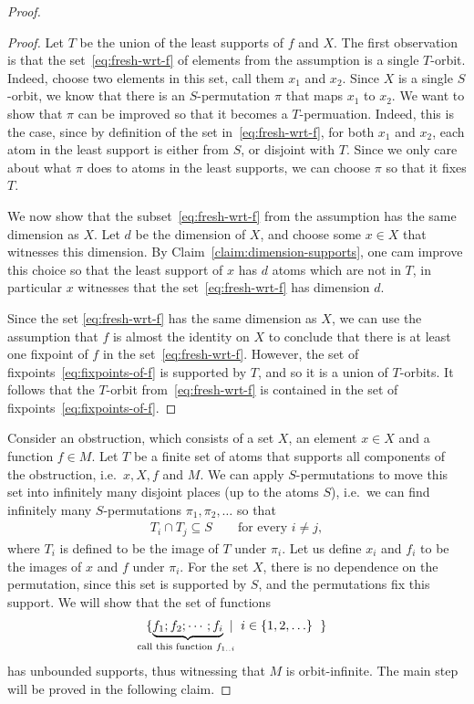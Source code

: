 \begin{proof}
\begin{proof}
        Let $T$ be the union of the least supports of $f$ and $X$. 
        The first observation is that the set~\eqref{eq:fresh-wrt-f} of elements from the assumption   is a single $T$-orbit.
        Indeed, choose two elements in this set, call them $x_1$ and $x_2$. Since $X$ is a single $S$-orbit, we know that there is an $S$-permutation $\pi$ that maps $x_1$ to $x_2$. We want to show that $\pi$ can be improved so that it becomes a $T$-permuation. Indeed, this is the case, since by definition of the set in~\eqref{eq:fresh-wrt-f}, for both $x_1$ and $x_2$, each atom in the least support is either from $S$, or disjoint with $T$. Since we only care about what $\pi$ does to atoms in the least supports, we can choose $\pi$ so that it fixes $T$. 
        
        We now show that the subset~\eqref{eq:fresh-wrt-f} from the assumption has the same dimension as $X$. 
        Let $d$ be the dimension of $X$, and choose some $x \in X$ that witnesses this dimension.  By Claim~\ref{claim:dimension-supports}, one cam improve this choice so that the least support of $x$ has $d$ atoms which are not in $T$, in particular $x$ witnesses that the set~\eqref{eq:fresh-wrt-f} has dimension $d$. 
        
        Since the set \eqref{eq:fresh-wrt-f} has the same dimension as $X$, we can use the assumption that $f$ is almost the identity on $X$ to conclude that there is at least one fixpoint of $f$ in the set~\eqref{eq:fresh-wrt-f}. However, the set of fixpoints~\eqref{eq:fixpoints-of-f} is supported by $T$, and so it is a union of $T$-orbits. It follows that the $T$-orbit from~\eqref{eq:fresh-wrt-f} is contained in the set of fixpoints~\eqref{eq:fixpoints-of-f}.
    \end{proof}


    Consider an obstruction, which consists of a set $X$, an element $x \in X$ and a function $f \in M$. Let $T$ be a finite set of atoms that supports all components of the obstruction, i.e.~$x, X,f$ and $M$. We can apply $S$-permutations to move this set into infinitely many disjoint places (up to the atoms $S$), i.e.~we can find infinitely many $S$-permutations $\pi_1,\pi_2,\ldots$ so that  
    \begin{align*}
    T_i \cap T_j \subseteq S \qquad \text{for every } i \neq j,
    \end{align*}
    where $T_i$ is defined to be the image of $T$ under $\pi_i$. Let us define $x_i$ and $f_i$ to be the images of $x$ and $f$ under $\pi_i$.  For the set $X$, there is no dependence on the permutation, since this set is supported by $S$, and the permutations fix this support. We will show that the set of functions 
    \begin{align*}
    \setbuild{ \myunderbrace{f_1; f_2; \cdots; f_i}{call this function $f_{1..i}$}}{ $i \in \set{1,2,\ldots}$}
    \end{align*}
    has unbounded supports, thus witnessing that $M$ is orbit-infinite. The main step will be proved in the following claim.
    

\end{proof}
